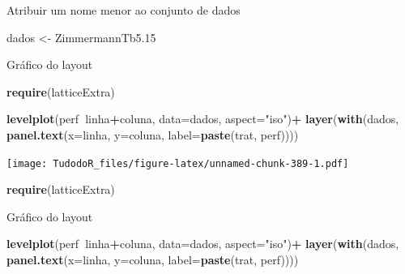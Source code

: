 \documentclass[
]{book}
\newenvironment{Shaded}{\begin{snugshade}}{\end{snugshade}}
\newcommand{\DataTypeTok}[1]{\textcolor[rgb]{0.13,0.29,0.53}{#1}}
\newcommand{\FloatTok}[1]{\textcolor[rgb]{0.00,0.00,0.81}{#1}}
\newcommand{\KeywordTok}[1]{\textcolor[rgb]{0.13,0.29,0.53}{\textbf{#1}}}
\newcommand{\NormalTok}[1]{#1}
\newcommand{\OperatorTok}[1]{\textcolor[rgb]{0.81,0.36,0.00}{\textbf{#1}}}
\newcommand{\StringTok}[1]{\textcolor[rgb]{0.31,0.60,0.02}{#1}}
\begin{document}
Atribuir um nome menor ao conjunto de dados

\begin{Shaded}
\begin{Highlighting}[]
\NormalTok{dados <-}\StringTok{ }\NormalTok{ZimmermannTb5}\FloatTok{.15}
\end{Highlighting}
\end{Shaded}

Gráfico do layout

\begin{Shaded}
\begin{Highlighting}[]
\KeywordTok{require}\NormalTok{(latticeExtra) }

\KeywordTok{levelplot}\NormalTok{(perf}\OperatorTok{~}\NormalTok{linha}\OperatorTok{+}\NormalTok{coluna, }
          \DataTypeTok{data=}\NormalTok{dados, }\DataTypeTok{aspect=}\StringTok{"iso"}\NormalTok{)}\OperatorTok{+}\StringTok{ }
\StringTok{          }\KeywordTok{layer}\NormalTok{(}\KeywordTok{with}\NormalTok{(dados, }
          \KeywordTok{panel.text}\NormalTok{(}\DataTypeTok{x=}\NormalTok{linha, }\DataTypeTok{y=}\NormalTok{coluna, }
          \DataTypeTok{label=}\KeywordTok{paste}\NormalTok{(trat, perf))))}
\end{Highlighting}
\end{Shaded}

\texttt{[image: TudodoR\_files/figure-latex/unnamed-chunk-389-1.pdf]}

\begin{Shaded}
\begin{Highlighting}[]
\KeywordTok{require}\NormalTok{(latticeExtra)}
\end{Highlighting}
\end{Shaded}

Gráfico do layout

\begin{Shaded}
\begin{Highlighting}[]
\KeywordTok{levelplot}\NormalTok{(perf}\OperatorTok{~}\NormalTok{linha}\OperatorTok{+}\NormalTok{coluna, }
          \DataTypeTok{data=}\NormalTok{dados, }\DataTypeTok{aspect=}\StringTok{"iso"}\NormalTok{)}\OperatorTok{+}\StringTok{ }
\StringTok{          }\KeywordTok{layer}\NormalTok{(}\KeywordTok{with}\NormalTok{(dados, }
          \KeywordTok{panel.text}\NormalTok{(}\DataTypeTok{x=}\NormalTok{linha, }\DataTypeTok{y=}\NormalTok{coluna, }
          \DataTypeTok{label=}\KeywordTok{paste}\NormalTok{(trat, perf))))}
\end{Highlighting}
\end{Shaded}
\end{document}
